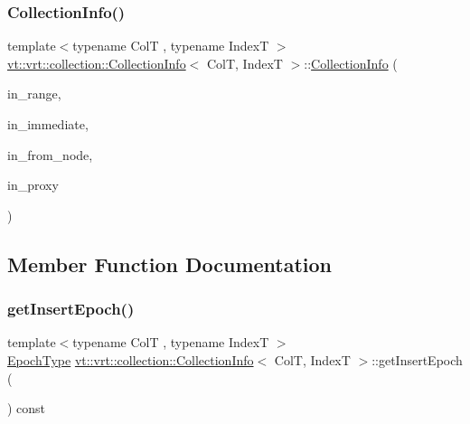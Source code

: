 \subsubsection{\texorpdfstring{Collection\+Info()}{CollectionInfo()}\hspace{0.1cm}{\footnotesize\ttfamily [3/3]}}
{\footnotesize\ttfamily template$<$typename ColT , typename IndexT $>$ \\
\hyperlink{structvt_1_1vrt_1_1collection_1_1_collection_info}{vt\+::vrt\+::collection\+::\+Collection\+Info}$<$ ColT, IndexT $>$\+::\hyperlink{structvt_1_1vrt_1_1collection_1_1_collection_info}{Collection\+Info} (\begin{DoxyParamCaption}\item[{IndexT const \&}]{in\+\_\+range,  }\item[{bool const}]{in\+\_\+immediate,  }\item[{\hyperlink{namespacevt_a866da9d0efc19c0a1ce79e9e492f47e2}{Node\+Type} const \&}]{in\+\_\+from\+\_\+node,  }\item[{\hyperlink{namespacevt_a1b417dd5d684f045bb58a0ede70045ac}{Virtual\+Proxy\+Type}}]{in\+\_\+proxy }\end{DoxyParamCaption})\hspace{0.3cm}{\ttfamily [inline]}}



\subsection{Member Function Documentation}
\mbox{\label{structvt_1_1vrt_1_1collection_1_1_collection_info_a9c81de9eeddd203f92d76d80b2e09e3c}} 
\subsubsection{\texorpdfstring{get\+Insert\+Epoch()}{getInsertEpoch()}}
{\footnotesize\ttfamily template$<$typename ColT , typename IndexT $>$ \\
\hyperlink{namespacevt_a81d11b28122d43bf9834577e4a06440f}{Epoch\+Type} \hyperlink{structvt_1_1vrt_1_1collection_1_1_collection_info}{vt\+::vrt\+::collection\+::\+Collection\+Info}$<$ ColT, IndexT $>$\+::get\+Insert\+Epoch (\begin{DoxyParamCaption}{ }\end{DoxyParamCaption}) const\hspace{0.3cm}{\ttfamily [inline]}}

